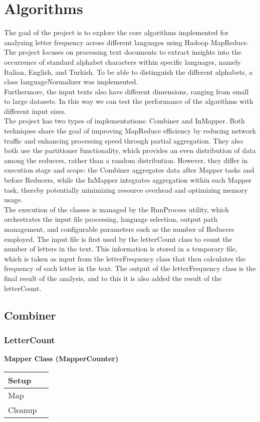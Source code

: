 \chapter{Algorithms}


The goal of the project is to explore the core algorithms implemented for analyzing letter frequency across different languages using Hadoop MapReduce. 
The project focuses on processing text documents to extract insights into the occurrence of standard alphabet characters within specific languages, namely Italian, English, and Turkish. 
To be able to distinguish the different alphabets, a class languageNormalizer was implemented. \\
Furthermore, the input texts also have different dimensions, ranging from small to large datasets.
In this way we can test the performance of the algorithms with different input sizes. \\
The project has two types of implementations: Combiner and InMapper. Both techniques share the goal of improving MapReduce efficiency by reducing network traffic and enhancing processing speed through partial aggregation. They also both use the partitioner functionality, which provides an even distribution of data among the reducers, rather than a random distribution. However, they differ in execution stage and scope: the Combiner aggregates data after Mapper tasks and before Reducers, while the InMapper integrates aggregation within each Mapper task, thereby potentially minimizing resource overhead and optimizing memory usage. \\
The execution of the classes is managed by the RunProcess utility, which orchestrates the input file processing, language selection, output path management, and configurable parameters such as the number of Reducers employed. The input file is first used by the letterCount class to count the number of letters in the text. This information is stored in a temporary file, which is taken as input from the letterFrequency class that then calculates the frequency of each letter in the text. The output of the letterFrequency class is the final result of the analysis, and to this it is also added the result of the letterCount.

\section{Combiner}

\subsection{LetterCount}
\textbf{Mapper Class (MapperCounter)}
\begin{longtable}{|>{\raggedright\arraybackslash}p{}|>{\raggedright\arraybackslash}p{}|}
    \hline
    Setup &  \\
    \hline
    Map &  \\
    \hline
    Cleanup & \\
    \hline
\end{longtable}

